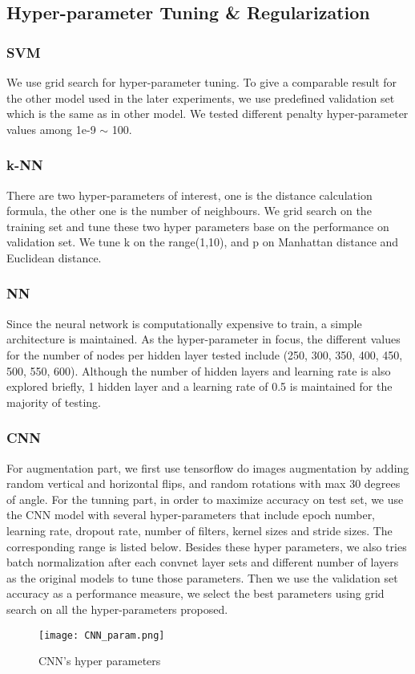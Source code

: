 \documentclass[conference]{IEEEtran}
\begin{document}
\subsection{Hyper-parameter Tuning \& Regularization}

\subsubsection{SVM}
We use grid search for hyper-parameter tuning. To give a comparable result for the other model used in the later experiments, we use predefined validation set which is the same as in other model. We tested different penalty hyper-parameter values among 1e-9 $\sim$ 100.

\subsubsection{k-NN}
There are two hyper-parameters of interest, one is the distance calculation formula, the other one is the number of neighbours. We grid search on the training set and tune these two hyper parameters base on the performance on validation set. We tune k on the range(1,10), and p on Manhattan distance and Euclidean distance.

\subsubsection{NN}
Since the neural network is computationally expensive to train, a simple  architecture is maintained. As the hyper-parameter in focus, the different values for the number of nodes per hidden layer tested include (250, 300, 350, 400, 450, 500, 550, 600). Although the number of hidden layers and learning rate is also explored briefly, 1 hidden layer and a learning rate of 0.5 is maintained for the majority of testing.

\subsubsection{CNN}
For augmentation part, we first use tensorflow do images augmentation by adding random vertical and horizontal flips, and random rotations with max 30 degrees of angle. For the tunning part, in order to maximize accuracy on test set, we use the CNN model with several hyper-parameters that include epoch number, learning rate, dropout rate, number of filters, kernel sizes and stride sizes. The corresponding range is listed below. Besides these hyper parameters, we also tries batch normalization after each convnet layer sets and different number of layers as the original models to tune those parameters. Then we use the validation set accuracy as a performance measure, we select the best parameters using grid search on all the hyper-parameters proposed.
\begin{figure}[!htbp]
\centering
\texttt{[image: CNN\_param.png]}
\caption{CNN's hyper parameters}
\end{figure}
\end{document}
